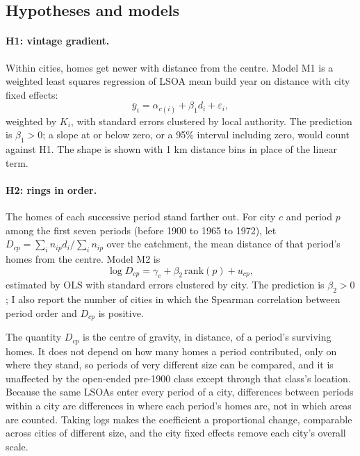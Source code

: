 \subsection{Hypotheses and models}
\paragraph{H1: vintage gradient.} Within cities, homes get newer with distance from the centre. Model M1 is a weighted least squares regression of LSOA mean build year on distance with city fixed effects:
\begin{equation}
\bar{y}_{i} = \alpha_{c(i)} + \beta_1 d_i + \varepsilon_i,
\end{equation}
weighted by $K_i$, with standard errors clustered by local authority. The prediction is $\beta_1>0$; a slope at or below zero, or a 95\% interval including zero, would count against H1. The shape is shown with 1 km distance bins in place of the linear term.

\paragraph{H2: rings in order.} The homes of each successive period stand farther out. For city $c$ and period $p$ among the first seven periods (before 1900 to 1965 to 1972), let $D_{cp}=\sum_i n_{ip} d_i/\sum_i n_{ip}$ over the catchment, the mean distance of that period's homes from the centre. Model M2 is
\begin{equation}
\log D_{cp} = \gamma_c + \beta_2\, \mathrm{rank}(p) + u_{cp},
\end{equation}
estimated by OLS with standard errors clustered by city. The prediction is $\beta_2>0$; I also report the number of cities in which the Spearman correlation between period order and $D_{cp}$ is positive.

The quantity $D_{cp}$ is the centre of gravity, in distance, of a period's surviving homes. It does not depend on how many homes a period contributed, only on where they stand, so periods of very different size can be compared, and it is unaffected by the open-ended pre-1900 class except through that class's location. Because the same LSOAs enter every period of a city, differences between periods within a city are differences in where each period's homes are, not in which areas are counted. Taking logs makes the coefficient a proportional change, comparable across cities of different size, and the city fixed effects remove each city's overall scale.

